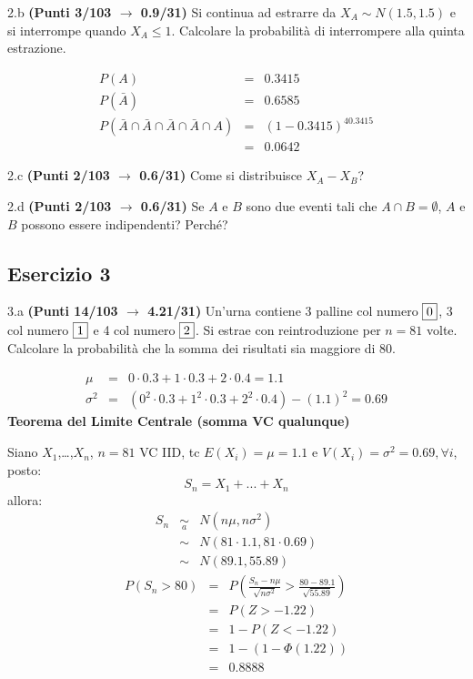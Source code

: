 \documentclass[
  11pt,
]{book}
\theoremstyle{mytheoremstyle}
\theoremstyle{mydefstyle}
\newenvironment{sol}
  {
  \begin{tcolorbox}[enhanced,breakable,arc=0.1mm,boxrule=1pt,colback=white,colframe=iblue,
  title=\bf \fontfamily{lmss}\selectfont \hspace{.5 cm} Soluzione,drop fuzzy shadow]

}{
\end{tcolorbox}
  }
\begin{document}
2.b \textbf{(Punti 3/103 \(\rightarrow\) 0.9/31)} Si continua ad estrarre da \(X_A\sim N(1.5,1.5)\) e si interrompe quando \(X_A\le 1\). Calcolare la probabilità di interrompere alla quinta estrazione.

\begin{sol}
\begin{eqnarray*}
  P(A) &=&  0.3415\\
  P(\bar A) &=& 0.6585\\
  P(\bar A\cap \bar A\cap\bar A\cap\bar A\cap A)&=& (1-0.3415)^40.3415\\
  &=& 0.0642
\end{eqnarray*}

\end{sol}

2.c \textbf{(Punti 2/103 \(\rightarrow\) 0.6/31)} Come si distribuisce \(X_A-X_B\)?

2.d \textbf{(Punti 2/103 \(\rightarrow\) 0.6/31)} Se \(A\) e \(B\) sono due eventi tali che \(A\cap B=\emptyset\), \(A\) e \(B\) possono essere indipendenti? Perché?

\subsection{Esercizio 3}\label{esercizio-3-25}

3.a \textbf{(Punti 14/103 \(\rightarrow\) 4.21/31)} Un'urna contiene 3 palline col numero \(\fbox{0}\), 3 col numero \(\fbox{1}\) e 4 col numero \(\fbox{2}\). Si estrae con reintroduzione per \(n=81\) volte.
Calcolare la probabilità che la somma dei risultati sia maggiore di 80.

\begin{sol}
\begin{eqnarray*}
 \mu &=&  0  \cdot 0.3+ 1  \cdot 0.3+ 2  \cdot 0.4 = 1.1 \\ \sigma^2 &=&(  0 ^2 \cdot 0.3+ 1 ^2 \cdot 0.3+ 2 ^2 \cdot 0.4 )-( 1.1 )^2= 0.69 \end{eqnarray*}\textbf{Teorema del Limite Centrale (somma VC qualunque)}

Siano \(X_1\),\ldots,\(X_n\), \(n=81\) VC IID, tc \(E(X_i)=\mu=1.1\) e \(V(X_i)=\sigma^2=0.69,\forall i\), posto:
\[
      S_n = X_1 + ... + X_n
      \]
allora:\begin{eqnarray*}
  S_n & \mathop{\sim}\limits_{a}& N(n\mu,n\sigma^2) \\
     &\sim & N(81\cdot1.1,81\cdot0.69) \\
     &\sim & N(89.1,55.89) 
  \end{eqnarray*}\begin{eqnarray*}
      P( S_n   >   80 ) 
        &=& P\left(  \frac { S_n  -  n\mu }{ \sqrt{n\sigma^2} }  >  \frac { 80  -  89.1 }{\sqrt{ 55.89 }} \right)  \\
                 &=& P\left(  Z   >   -1.22 \right) \\    &=& 1-P(Z< -1.22 )\\ 
                 &=&  1-(1-\Phi( 1.22 )) \\ &=&  0.8888 
      \end{eqnarray*}

\end{sol}
\end{document}
